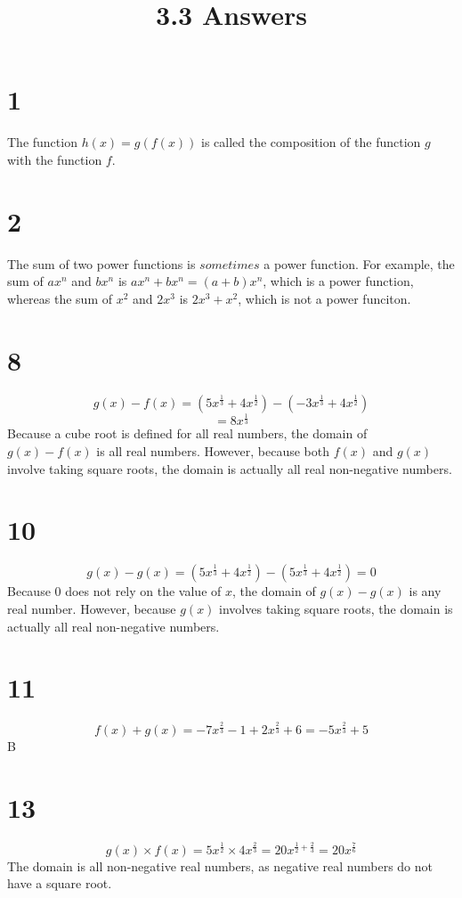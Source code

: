 \documentclass{article}
\title{3.3 Answers}
\theoremstyle{definition}
\begin{document}
\maketitle

\section*{1}
The function $h(x)=g(f(x))$ is called the composition of the function $g$ with the function $f$.

\section*{2}
The sum of two power functions is $sometimes$ a power function. For example, the sum of $ax^n$ and $bx^n$ is $ax^n+bx^n=(a+b)x^n$, which is a power 
function, whereas the sum of $x^2$ and $2x^3$ is $2x^3+x^2$, which is not a power funciton.

\section*{8}
\[ g(x)-f(x)=(5x^\frac{1}{3}+4x^\frac{1}{2})-(-3x^\frac{1}{3}+4x^\frac{1}{2}) \]
\[ =8x^\frac{1}{3} \]
Because a cube root is defined for all real numbers, the domain of $g(x)-f(x)$ is all real numbers. However, because both $f(x)$ and $g(x)$ involve 
taking square roots, the domain is actually all real non-negative numbers.

\section*{10}
\[ g(x)-g(x)=(5x^\frac{1}{3}+4x^\frac{1}{2})-(5x^\frac{1}{3}+4x^\frac{1}{2})=0 \]
Because $0$ does not rely on the value of $x$, the domain of $g(x)-g(x)$ is any real number. However, because $g(x)$ involves 
taking square roots, the domain is actually all real non-negative numbers.

\section*{11}
\[ f(x)+g(x)=-7x^\frac{2}{3}-1+2x^\frac{2}{3}+6=-5x^\frac{2}{3}+5 \]
B

\section*{13}
\[ g(x)\times f(x)=5x^\frac{1}{2}\times 4x^\frac{2}{3}=20x^{\frac{1}{2}+\frac{2}{3}}=20x^\frac{7}{6} \]
The domain is all non-negative real numbers, as negative real numbers do not have a square root.
\end{document}
